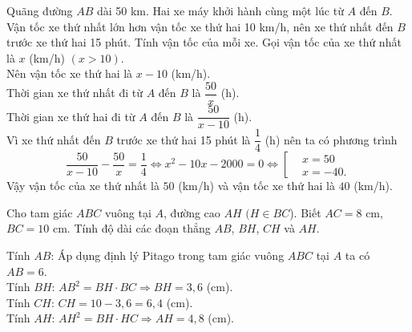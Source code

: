 \begin{ex}%
Quãng đường $AB$ dài 50 km. Hai xe máy khởi hành cùng một lúc từ $A$ đến $B$. Vận tốc xe thứ nhất lớn hơn vận tốc xe thứ hai 10 km/h, nên xe thứ nhất đến $B$ trước xe thứ hai 15 phút. Tính vận tốc của mỗi xe.
	\loigiai
{Gọi vận tốc của xe thứ nhất là $x$ (km/h) $(x>10)$.\\
Nên vận tốc xe thứ hai là $x-10$ (km/h).\\
Thời gian xe thứ nhất đi từ $A$ đến $B$ là $\dfrac{50}{x}$ (h).\\
Thời gian xe thứ hai đi từ $A$ đến $B$ là $\dfrac{50}{x-10}$ (h).\\
Vì xe thứ nhất đến $B$ trước xe thứ hai 15 phút là $\dfrac{1}{4}$ (h) nên ta có phương trình $$\dfrac{50}{x-10}-\dfrac{50}{x}=\dfrac{1}{4}\Leftrightarrow x^2-10x-2000=0 \Leftrightarrow \left[\begin{aligned}&x=50\\&x=-40. \end{aligned} \right.$$
Vậy vận tốc của xe thứ nhất là $50$ (km/h) và vận tốc xe thứ hai là $40$ (km/h).
	}
\end{ex}

\begin{ex}%
Cho tam giác $ABC$ vuông tại $A$, đường cao $AH$ $(H\in BC$). Biết $AC=8$ cm, $BC=10$ cm. Tính độ dài các đoạn thẳng $AB$, $BH$, $CH$ và $AH$.
\loigiai
{
\begin{center}
\end{center}
	Tính $AB$: Áp dụng định lý Pitago trong tam giác vuông $ABC$ tại $A$ ta có $AB=6$.\\
	Tính $BH$: $AB^2=BH \cdot BC \Rightarrow BH=3{,}6$ (cm).\\
	Tính $CH$: $CH=10-3{,}6=6{,}4$ (cm).\\
	Tính $AH$: $AH^2=BH \cdot HC \Rightarrow AH=4{,}8$ (cm).
	}
\end{ex}

